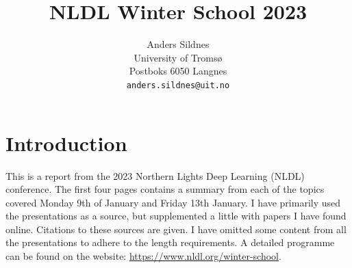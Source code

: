 \documentclass[10pt,twocolumn,letterpaper]{article}
\begin{document}
\title{NLDL Winter School 2023}

\author{Anders Sildnes\\
University of Tromsø\\
Postboks 6050 Langnes\\
{\tt\small anders.sildnes@uit.no}
}
\maketitle


\section{Introduction} \label{sec:intro}
This is a report from the 2023 Northern Lights Deep Learning (NLDL) conference. The first four pages contains a summary from each of the topics covered Monday 9th of January and Friday 13th January. I have primarily used the presentations as a source, but supplemented a little with papers I have found online. Citations to these sources are given. 
I have omitted some content from all the presentations to adhere to the length requirements. A detailed programme can be found on the website: \href{https://www.nldl.org/winter-school}{https://www.nldl.org/winter-school}. 
\end{document}
